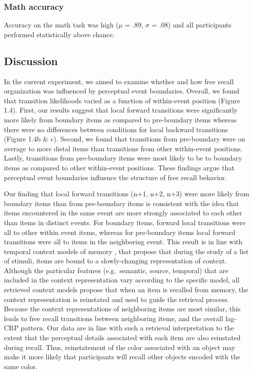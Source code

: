 \subsubsection{Math accuracy}\label{math-accuracy}

Accuracy on the math task was high (\(\mu\) = .89, \(\sigma\) = .08) and
all participants performed statistically above chance.

\subsection{Discussion}\label{discussion-2}

In the current experiment, we aimed to examine whether and how free
recall organization was influenced by perceptual event boundaries.
Overall, we found that transition likelihoods varied as a function of
within-event position (Figure 1.4). First, our results suggest that
local forward transitions were significantly more likely from boundary
items as compared to pre-boundary items whereas there were no
differences between conditions for local backward transitions (Figure
1.4b \& c). Second, we found that transitions from pre-boundary were on
average to more distal items than transitions from other within-event
positions. Lastly, transitions from pre-boundary items were most likely
to be to boundary items as compared to other within-event positions.
These findings argue that perceptual event boundaries influence the
structure of free recall behavior.

Our finding that local forward transitions (n+1, n+2, n+3) were more
likely from boundary items than from pre-boundary items is consistent
with the idea that items encountered in the same event are more strongly
associated to each other than items in distinct events. For boundary
items, forward local transitions were all to other within event items,
whereas for pre-boundary items local forward transitions were all to
items in the neighboring event. This result is in line with temporal
context models of memory
\autocites{howard_distributed_2002}{manning_oscillatory_2011}{polyn_category-specific_2005}{polyn_context_2009},
that propose that during the study of a list of stimuli, items are bound
to a slowly-changing representation of context. Although the particular
features (e.g.~semantic, source, temporal) that are included in the
context representation vary according to the specific model, all
retrieved context models propose that when an item is recalled from
memory, the context representation is reinstated and used to guide the
retrieval process. Because the context representations of neighboring
items are most similar, this leads to free recall transitions between
neighboring items, and the overall lag-CRP pattern. Our data are in line
with such a retrieval interpretation to the extent that the perceptual
details associated with each item are also reinstated during recall.
Thus, reinstatement of the color associated with an object may make it
more likely that participants will recall other objects encoded with the
same color.

